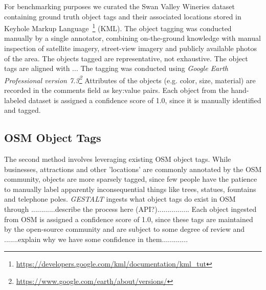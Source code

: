 For benchmarking purposes we curated the Swan Valley Wineries dataset containing ground truth object tags and their associated locations stored in Keyhole Markup Language~\footnote{\href{https://developers.google.com/kml/documentation/kml_tut}{https://developers.google.com/kml/documentation/kml_tut}} (KML).
The object tagging was conducted manually by a single annotator, combining on-the-ground knowledge with manual inspection of satellite imagery, street-view imagery and publicly available photos of the area. 
The objects tagged are representative, not exhaustive. 
The object tags are aligned with ... 
The tagging was conducted using \textit{Google Earth Professional version 7.3\footnote{\href{https://www.google.com/earth/about/versions/}{https://www.google.com/earth/about/versions/}}}
Attributes of the objects (e.g. color, size, material) are recorded in the comments field as key:value pairs.
Each object from the hand-labeled dataset is assigned a confidence score of 1.0, since it is manually identified and tagged.


\subsection{OSM Object Tags}
The second method involves leveraging existing OSM object tags.
While businesses, attractions and other 'locations' are commonly annotated by the OSM community, objects are more sparsely tagged, since few people have the patience to manually label apparently inconsequential things like trees, statues, fountains and telephone poles. 
\emph{GESTALT} ingests what object tags do exist in OSM through 
............describe the process here (API?)................
Each object ingested from OSM is assigned a confidence score of 1.0, since these tags are maintained by the open-source community and are subject to some degree of review and .......explain why we have some confidence in them.............


